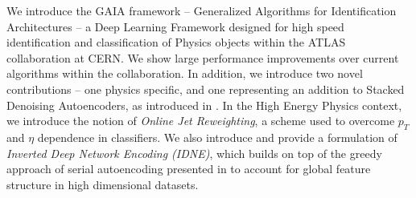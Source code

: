 
We introduce the GAIA framework -- Generalized Algorithms for Identification Architectures -- a Deep Learning Framework designed for high speed identification and classification of Physics objects within the ATLAS collaboration at CERN. We show large performance improvements over current algorithms within the collaboration. In addition, we introduce two novel contributions -- one physics specific, and one representing an addition to Stacked Denoising Autoencoders, as introduced in \citet{Vincent2008}. In the High Energy Physics context, we introduce the notion of \textit{Online Jet Reweighting}, a scheme used to overcome $p_T$ and $\eta$ dependence in classifiers. We also introduce and provide a formulation of \textit{Inverted Deep Network Encoding (IDNE)}, which builds on top of the greedy approach of serial autoencoding presented in \citep{Vincent2008} to account for global feature structure in high dimensional datasets. 